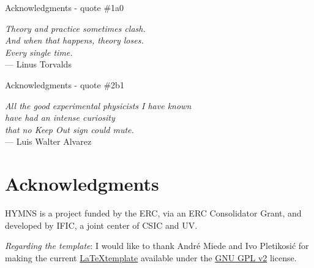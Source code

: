 
\begin{ocg}{Acknowledgments - quote \#1}{a}{0}

\begin{flushright}{\slshape
    Theory and practice sometimes clash.\\
    And when that happens, theory loses.\\
    Every single time. } \\ \medskip
    --- Linus Torvalds
\end{flushright}

\end{ocg}

\medskip

\begin{ocg}{Acknowledgments - quote \#2}{b}{1}

\begin{flushright}{\slshape
    All the good experimental physicists I have known\\
    have had an intense curiosity\\
    that no Keep Out sign could mute.} \\ \medskip
    --- Luis Walter Alvarez
\end{flushright}

\end{ocg}

\bigskip

\begingroup
\let\clearpage\relax
\let\cleardoublepage\relax
\let\cleardoublepage\relax
\chapter*{Acknowledgments}
\ac{HYMNS} is a project funded by the \ac{ERC}, via an ERC Consolidator Grant, and developed by \ac{IFIC}, a joint center of \ac{CSIC} and \ac{UV}.

\bigskip

\noindent\emph{Regarding the template}: I would like to thank Andr\'e Miede and Ivo Pletikosić for making the current \href{https://bitbucket.org/amiede/classicthesis/}{\LaTeX template} available under the \href{https://www.gnu.org/licenses/old-licenses/gpl-2.0.en.html}{GNU GPL v2} license.


\endgroup
